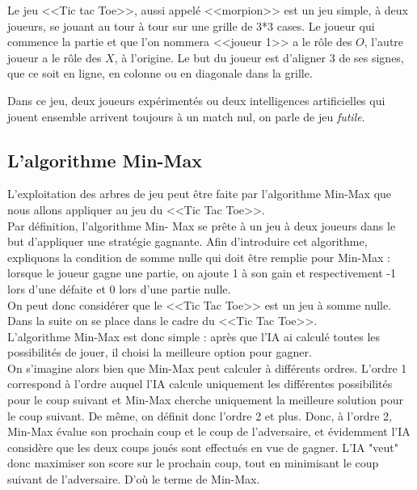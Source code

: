 \documentclass{article}
\begin{document}
Le jeu <<Tic tac Toe>>, aussi appelé <<morpion>> est un jeu simple, à deux joueurs, se jouant au tour à tour sur une grille de 3*3 cases.
Le joueur qui commence la partie et que l'on nommera <<joueur 1>> a le rôle des $O$, l'autre joueur a le rôle des $X$, à l'origine.
Le but du joueur est d'aligner 3 de ses signes, que ce soit en ligne, en colonne ou en diagonale dans la grille.

Dans ce jeu, deux joueurs expérimentés ou deux intelligences artificielles qui jouent ensemble arrivent toujours à un match
nul, on parle de jeu \emph{futile}.


\subsection{L'algorithme Min-Max}

L'exploitation des arbres de jeu peut être faite par l'algorithme Min-Max 
que nous allons appliquer au jeu du <<Tic Tac Toe>>. \\

Par définition, l'algorithme Min-
Max se prête à un jeu à deux joueurs dans le but d'appliquer une stratégie
gagnante. 
Afin d'introduire cet algorithme, expliquons la condition de somme nulle qui
doit être remplie pour Min-Max : 
lorsque le joueur gagne une partie, on ajoute 1 à son gain et respectivement -1
lors 
d'une défaite et 0 lors d'une partie nulle. \\

On peut donc considérer que le <<Tic Tac Toe>> est un jeu à somme nulle.
Dans la suite on se place dans le cadre du <<Tic Tac Toe>>. \\

L'algorithme Min-Max est donc simple : après que l'IA ai calculé toutes les
possibilités de jouer,
 il choisi la meilleure option pour gagner. \\

On s'imagine alors bien que Min-Max peut calculer à différents ordres. L'ordre 1
correspond à l'ordre auquel 
l'IA calcule uniquement les différentes possibilités pour le coup suivant et
Min-Max cherche uniquement 
la meilleure solution pour le coup suivant. De même, on définit donc l'ordre 2
et plus.
Donc, à l'ordre 2, Min-Max évalue son prochain coup et le coup de l'adversaire,
et évidemment 
l'IA considère que les deux coups joués sont effectués en vue de gagner. L'IA
"veut" donc 
maximiser son score sur le prochain coup, tout en minimisant le coup suivant de
l'adversaire.
D'où le terme de Min-Max.
\end{document}
